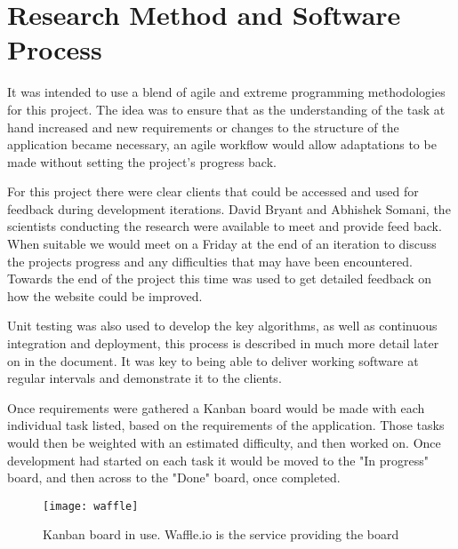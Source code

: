

\section{Research Method and Software Process}
It was intended to use a blend of agile and extreme programming methodologies for this project. The idea was to ensure that as the understanding of the task at hand increased and new requirements or changes to the structure of the application became necessary, an agile workflow would allow adaptations to be made without setting the project's progress back. 

For this project there were clear clients that could be accessed and used for feedback during development iterations. David Bryant and Abhishek Somani, the scientists conducting the research were available to meet and provide feed back. When suitable we would meet on a Friday at the end of an iteration to discuss the projects progress and any difficulties that may have been encountered. Towards the end of the project this time was used to get detailed feedback on how the website could be improved. 

Unit testing was also used to develop the key algorithms, as well as continuous integration and deployment, this process is described in much more detail later on in the document. It was key to being able to deliver working software at regular intervals and demonstrate it to the clients. 

Once requirements were gathered a Kanban board would be made with each individual task listed, based on the requirements of the application. Those tasks would then be weighted with an estimated difficulty, and then worked on. Once development had started on each task it would be moved to the "In progress" board, and then across to the "Done" board, once completed. 

\begin{figure}[ht!]
\begin{center}
\texttt{[image: waffle]}
\caption{Kanban board in use. Waffle.io is the service providing the board}
\end{center}
\end{figure}


